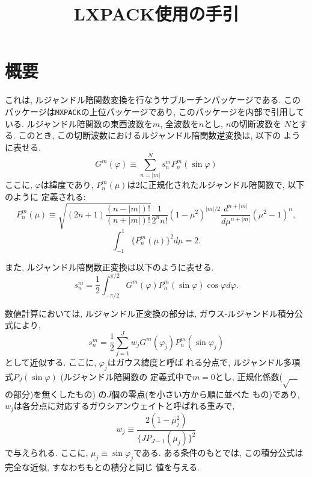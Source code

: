 \documentclass[a4j]{jarticle}
\title{LXPACK使用の手引}
\author{}
\date{}
\begin{document}
\maketitle

\section{概要}

これは, ルジャンドル陪関数変換を行なうサブルーチンパッケージである.
このパッケージは\texttt{MXPACK}の上位パッケージであり, 
このパッケージを内部で引用している.
ルジャンドル陪関数の東西波数を$m$, 全波数を$n$とし, $n$の切断波数を
$N$とする.
このとき, この切断波数におけるルジャンドル陪関数逆変換は, 以下の
ように表せる.
\begin{equation}
G^m(\varphi)\equiv\sum^N_{n=|m|}s^m_nP^m_n(\sin\varphi)
\end{equation}
ここに, $\varphi$は緯度であり, 
$P^m_n(\mu)$は2に正規化されたルジャンドル陪関数で, 以下のように
定義される:
\begin{equation}
P^m_n(\mu)\equiv\sqrt{(2n+1)\frac{(n-|m|)!}{(n+|m|)!}}
\frac1{2^nn!}(1-\mu^2)^{|m|/2}
\frac{d^{n+|m|}}{d\mu^{n+|m|}}(\mu^2-1)^n,
\end{equation}
\begin{equation}
\int^1_{-1}\{P^m_n(\mu)\}^2d\mu=2.
\end{equation}

また, ルジャンドル陪関数正変換は以下のように表せる.
\begin{equation}
s^m_n=\frac12\int^{\pi/2}_{-\pi/2}G^m(\varphi)P^m_n(\sin\varphi)\cos\varphi
d\varphi.
\end{equation}

数値計算においては, 
ルジャンドル正変換の部分は, ガウス-ルジャンドル積分公式により,
\begin{equation}
s^m_n=\frac12\sum^J_{j=1}w_jG^m(\varphi_j)P^m_n(\sin\varphi_j)
\end{equation}
として近似する. ここに, $\varphi_j$はガウス緯度と呼ば
れる分点で, ルジャンドル多項式$P_J(\sin\varphi)$ (ルジャンドル陪関数の
定義式中で$m=0$とし, 正規化係数($\sqrt{\quad}$の部分)を無くしたもの)
の$J$個の零点(を小さい方から順に並べた
もの)であり, $w_j$は各分点に対応するガウシアンウェイトと呼ばれる重みで,
\begin{equation}
w_j\equiv\frac{2(1-\mu_j^2)}{\{JP_{J-1}(\mu_j)\}^2}
\end{equation}
で与えられる. ここに, $\mu_j\equiv\sin\varphi_j$である.
ある条件のもとでは, この積分公式は完全な近似, すなわちもとの積分と同じ
値を与える.
\end{document}
